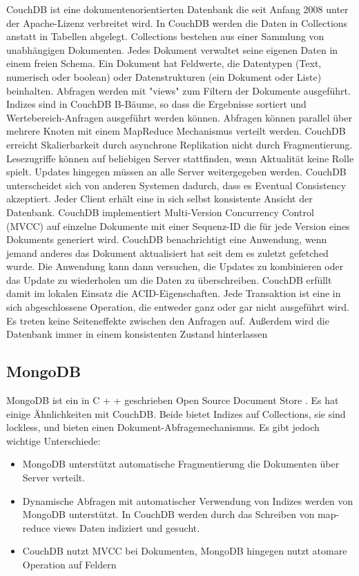 CouchDB \cite{couch2013} ist eine dokumentenorientierten Datenbank die seit Anfang 2008 unter der  Apache-Lizenz verbreitet wird. In CouchDB werden die Daten in Collections anstatt in Tabellen abgelegt. Collections bestehen aus einer Sammlung von unabhängigen Dokumenten. Jedes Dokument verwaltet seine eigenen Daten in einem freien Schema. 
Ein Dokument hat Feldwerte, die Datentypen (Text, numerisch oder boolean) oder Datenstrukturen (ein Dokument oder Liste) beinhalten. Abfragen werden mit "views" zum Filtern der Dokumente ausgeführt. Indizes sind in CouchDB B-Bäume, so dass die Ergebnisse sortiert und Wertebereich-Anfragen ausgeführt werden können. Abfragen können parallel über mehrere Knoten mit einem MapReduce Mechanismus verteilt werden. CouchDB erreicht Skalierbarkeit durch asynchrone Replikation nicht durch Fragmentierung. Lesezugriffe können auf beliebigen Server stattfinden, wenn Aktualität keine Rolle spielt. Updates hingegen müssen an alle Server weitergegeben werden.
CouchDB unterscheidet sich von anderen Systemen dadurch, dass es Eventual Consistency akzeptiert. Jeder Client erhält eine in sich selbst konsistente Ansicht der Datenbank. CouchDB implementiert Multi-Version Concurrency Control (MVCC) auf einzelne Dokumente mit einer Sequenz-ID die für jede Version eines Dokuments generiert wird. CouchDB benachrichtigt eine Anwendung, wenn jemand anderes das Dokument aktualisiert hat seit dem es zuletzt gefetched wurde. Die Anwendung kann dann versuchen, die Updates zu kombinieren oder das Update zu wiederholen um die Daten zu überschreiben. CouchDB erfüllt damit im lokalen Einsatz die ACID-Eigenschaften. Jede Transaktion ist eine in sich abgeschlossene Operation, die entweder ganz oder gar nicht ausgeführt wird. Es treten keine Seiteneffekte zwischen den Anfragen auf. Außerdem wird die Datenbank immer in einem konsistenten Zustand hinterlassen

\subsection{MongoDB}

MongoDB ist ein in C + + geschrieben Open Source Document Store \cite{books/daglib/0025185}. Es hat einige Ähnlichkeiten mit CouchDB. Beide bietet Indizes auf Collections, sie sind lockless, und bieten einen Dokument-Abfragemechanismus. Es gibt jedoch wichtige Unterschiede:

\begin{itemize}

	\item MongoDB unterstützt automatische Fragmentierung die Dokumenten über Server verteilt.
	\item Dynamische Abfragen mit automatischer Verwendung von Indizes werden von MongoDB unterstützt. In CouchDB werden durch das Schreiben von map-reduce views Daten indiziert und gesucht.
	\item CouchDB nutzt MVCC bei Dokumenten, MongoDB hingegen nutzt atomare Operation auf Feldern    

\end{itemize}

